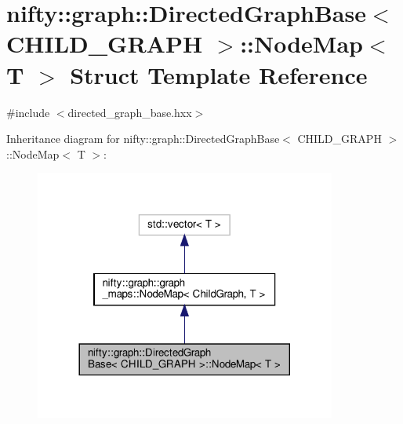 \hypertarget{structnifty_1_1graph_1_1DirectedGraphBase_1_1NodeMap}{}\section{nifty\+:\+:graph\+:\+:Directed\+Graph\+Base$<$ C\+H\+I\+L\+D\+\_\+\+G\+R\+A\+PH $>$\+:\+:Node\+Map$<$ T $>$ Struct Template Reference}
\label{structnifty_1_1graph_1_1DirectedGraphBase_1_1NodeMap}


{\ttfamily \#include $<$directed\+\_\+graph\+\_\+base.\+hxx$>$}



Inheritance diagram for nifty\+:\+:graph\+:\+:Directed\+Graph\+Base$<$ C\+H\+I\+L\+D\+\_\+\+G\+R\+A\+PH $>$\+:\+:Node\+Map$<$ T $>$\+:
\nopagebreak
\begin{figure}[H]
\begin{center}
\leavevmode
\includegraphics[width=281pt]{structnifty_1_1graph_1_1DirectedGraphBase_1_1NodeMap__inherit__graph}
\end{center}
\end{figure}


